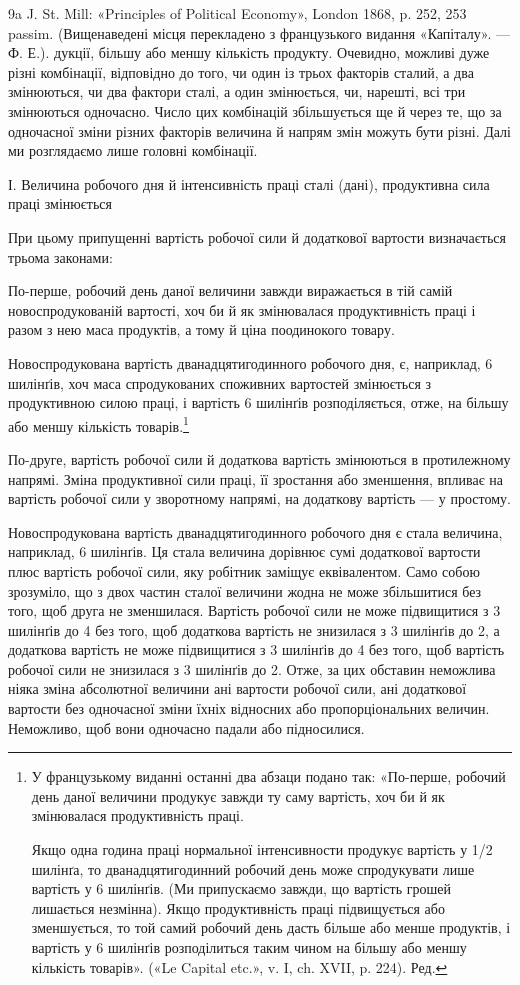 9a J. St. Mill: «Principles of Political Economy», London 1868,
p. 252, 253 passim. (Вищенаведені місця перекладено з французького
видання «Капіталу». — Ф. Е.).
дукції, більшу або меншу кількість продукту. Очевидно, можливі
дуже різні комбінації, відповідно до того, чи один із трьох факторів
сталий, а два змінюються, чи два фактори сталі, а один
змінюється, чи, нарешті, всі три змінюються одночасно. Число
цих комбінацій збільшується ще й через те, що за одночасної
зміни різних факторів величина й напрям змін можуть бути
різні. Далі ми розглядаємо лише головні комбінації.

І. Величина робочого дня й інтенсивність праці сталі (дані),
продуктивна сила праці змінюється

При цьому припущенні вартість робочої сили й додаткової
вартости визначається трьома законами:

По-перше, робочий день даної величини завжди виражається
в тій самій новоспродукованій вартості, хоч би й як змінювалася
продуктивність праці і разом з нею маса продуктів, а тому й
ціна поодинокого товару.

Новоспродукована вартість дванадцятигодинного робочого
дня, є, наприклад, 6 шилінґів, хоч маса спродукованих споживних
вартостей змінюється з продуктивною силою праці, і вартість
6 шилінґів розподіляється, отже, на більшу або меншу кількість
товарів.\footnote*{
У французькому виданні останні два абзаци подано так: «По-перше,
робочий день даної величини продукує завжди ту саму вартість,
хоч би й як змінювалася продуктивність праці.

Якщо одна година праці нормальної інтенсивности продукує вартість
у 1/2 шилінґа, то дванадцятигодинний робочий день може спродукувати
лише вартість у 6 шилінґів. (Ми припускаємо завжди, що вартість грошей
лишається незмінна). Якщо продуктивність праці підвищується або зменшується,
то той самий робочий день дасть більше або менше продуктів,
і вартість у 6 шилінґів розподілиться таким чином на більшу або меншу
кількість товарів». («Le Capital etc.», v. I, ch. XVII, p. 224). Ред.
}

По-друге, вартість робочої сили й додаткова вартість змінюються
в протилежному напрямі. Зміна продуктивної сили праці,
її зростання або зменшення, впливає на вартість робочої сили у
зворотному напрямі, на додаткову вартість — у простому.

Новоспродукована вартість дванадцятигодинного робочого
дня є стала величина, наприклад, 6 шилінґів. Ця стала величина
дорівнює сумі додаткової вартости плюс вартість робочої сили,
яку робітник заміщує еквівалентом. Само собою зрозуміло, що
з двох частин сталої величини жодна не може збільшитися без
того, щоб друга не зменшилася. Вартість робочої сили не може
підвищитися з 3 шилінґів до 4 без того, щоб додаткова вартість
не знизилася з 3 шилінґів до 2, а додаткова вартість не може
підвищитися з 3 шилінґів до 4 без того, щоб вартість робочої
сили не знизилася з 3 шилінґів до 2. Отже, за цих обставин неможлива
ніяка зміна абсолютної величини ані вартости робочої
сили, ані додаткової вартости без одночасної зміни їхніх відносних
або пропорціональних величин. Неможливо, щоб вони одночасно
падали або підносилися.
